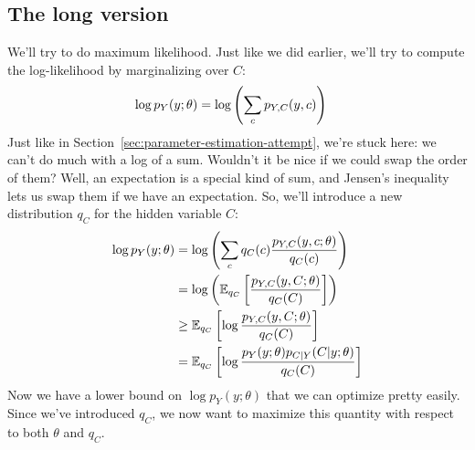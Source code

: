 \documentclass[12pt]{article}
\begin{document}
    \subsection{The long version}
    \label{sec:em-long}
    We'll try to do maximum likelihood. Just like we did earlier, we'll try to
    compute the log-likelihood by marginalizing over $C$:
    \begin{align}
        \notag \log p_Y(y; \theta) 
        &= \log\left(\sum_c p_{Y,C}(y,c)\right)
    \end{align}
    Just like in Section~\ref{sec:parameter-estimation-attempt}, we're stuck
    here: we can't do much with a log of a sum.  Wouldn't it be nice if we
    could swap the order of them? Well, an expectation is a special kind of
    sum, and Jensen's inequality lets us swap them if we have an expectation.
    So, we'll introduce a new distribution $q_C$ for the hidden variable $C$:
    \begin{align}
        \log p_Y(y; \theta) 
        \notag &= \log\left(\sum_c q_C(c) \frac{p_{Y,C}(y,c; \theta)}{q_C(c)}\right) \\
        \notag &= \log\left(\mathbb{E}_{q_C}\left[\frac{p_{Y,C}(y,C; \theta)}{q_C(C)}\right]\right) \\
        \label{eq:em-core-theta} &\geq \mathbb{E}_{q_C}\left[\log \frac{p_{Y,C}(y,C; \theta)}{q_C(C)} \right] \\
        \label{eq:em-core-q} &= \mathbb{E}_{q_C}\left[\log \frac{p_{Y}(y; \theta)p_{C|Y}(C|y; \theta)}{q_C(C)} \right]
    \end{align}
    Now we have a lower bound on $\log p_Y(y; \theta)$ that we can optimize
    pretty easily. Since we've introduced $q_C$, we now want to maximize
    this quantity with respect to both $\theta$ and $q_C$.
\end{document}
